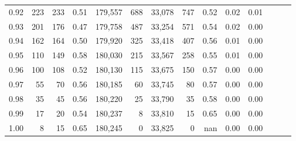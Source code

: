\begin{tabular}{rrrrrrrrrrrrrr}
0.92 &    223 &  233 &  0.51 &  179,557 &      688 &  33,078 &     747 &  0.52 &  0.02 &      0.01 \\
0.93 &    201 &  176 &  0.47 &  179,758 &      487 &  33,254 &     571 &  0.54 &  0.02 &      0.00 \\
0.94 &    162 &  164 &  0.50 &  179,920 &      325 &  33,418 &     407 &  0.56 &  0.01 &      0.00 \\
0.95 &    110 &  149 &  0.58 &  180,030 &      215 &  33,567 &     258 &  0.55 &  0.01 &      0.00 \\
0.96 &    100 &  108 &  0.52 &  180,130 &      115 &  33,675 &     150 &  0.57 &  0.00 &      0.00 \\
0.97 &     55 &   70 &  0.56 &  180,185 &       60 &  33,745 &      80 &  0.57 &  0.00 &      0.00 \\
0.98 &     35 &   45 &  0.56 &  180,220 &       25 &  33,790 &      35 &  0.58 &  0.00 &      0.00 \\
0.99 &     17 &   20 &  0.54 &  180,237 &        8 &  33,810 &      15 &  0.65 &  0.00 &      0.00 \\
1.00 &      8 &   15 &  0.65 &  180,245 &        0 &  33,825 &       0 &   nan &  0.00 &      0.00 \\
\bottomrule
\end{tabular}
